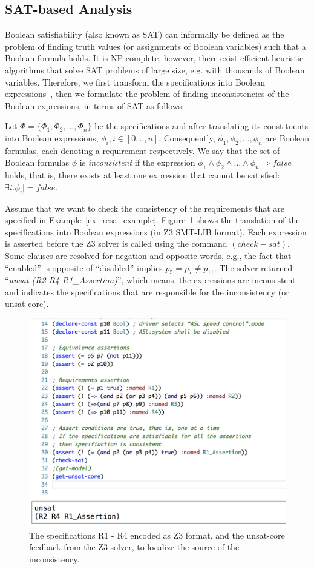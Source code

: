 \subsection*{SAT-based Analysis}
Boolean satisfiability (also known as SAT) can informally be defined as the problem of finding truth values (or assignments of Boolean variables) such that a Boolean formula holds. It is NP-complete, however, there exist efficient heuristic algorithms that solve SAT problems of large size, e.g. with thousands of Boolean variables. Therefore, we first transform the \resa{} specifications into Boolean expressions~\cite{resatool}, then we formulate the problem of finding inconsistencies of the Boolean expressions, in terms of SAT as follows:
\begin{definition}
	Let $\Phi = \{\Phi_1, \Phi_2,\dots,\Phi_n\}$ be the \resa{} specifications and after translating its constituents into Boolean expressions,  $\phi_i, i \in [0,..,n]$. Consequently, $\phi_1, \phi_2,...,\phi_n$ are Boolean formulas, each denoting a requirement respectively. We say that the set of Boolean formulas $\phi$ is \textit{inconsistent} if the expression $\phi_1 \land \phi_2 \land\dots\land \phi_n \Rightarrow false$ holds, that is, there exists at least one expression that cannot be satisfied:  $\exists i. \phi_i |= false$. 
\end{definition}
\begin{example}
Assume that we want to check the consistency of the requirements that are specified in Example~\ref{ex_resa_example}. Figure~\ref{fig_z3} shows the translation of the specifications into Boolean expressions (in Z3  SMT-LIB format). Each expression is asserted before the Z3 solver is called using the command $(check-sat)$. Some clauses are resolved for negation and opposite words, e.g., the fact that ``enabled'' is opposite of ``disabled'' implies $p_5=p_7\neq p_{11}$. The solver returned ``\textit{unsat (R2 R4 R1\_Assertion)}'',  which means, the expressions are inconsistent and indicates the specifications that are responsible for the inconsistency (or unsat-core).
\end{example}
\begin{figure}[h]
	\centering
	\includegraphics[width=0.7\linewidth]{images/z3}
	\caption{The \resa{} specifications R1 - R4 encoded as Z3 format, and the unsat-core feedback from the Z3 solver, to localize the source of the inconsistency.}
	\label{fig_z3}
\end{figure}

